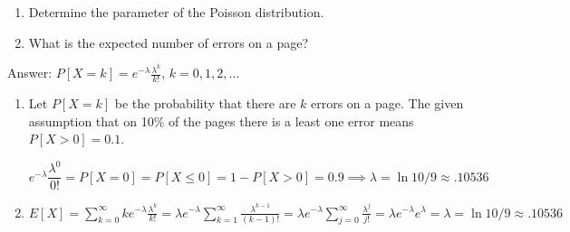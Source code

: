 \documentclass{article}
\begin{document}
\begin{enumerate}
\begin{enumerate}
\item 
Determine the parameter of the Poisson distribution.
\item
What is the expected number of errors on a page?
\end{enumerate}

Answer: $P[X = k] = e^{-\lambda}\frac{\lambda^k}{k!}$, $k = 0,1,2,\dots $

\begin{enumerate}
\item Let $P[X = k]$ be the probability that there are $k$ errors on a page. The given assumption that on 10\% of the pages there is a least one error means $P[X >0] = 0.1$.

$$
e^{-\lambda} \frac{\lambda^0}{0!} = P[X = 0] = P[X \leq 0] = 1- P[X > 0] = 0.9 \implies \lambda = \boxed{\ln 10/9 \approx .10536}
$$

\item

$E[X] = \sum_{k=0}^\infty k e^{-\lambda} \frac{\lambda^k}{k!} = \lambda e^{-\lambda} \sum_{k=1}^\infty \frac{\lambda^{k-1}}{(k-1)!} = \lambda e^{-\lambda} \sum_{j=0}^\infty \frac{\lambda^j}{j!} = \lambda e^{-\lambda} e^{\lambda} = \lambda = \boxed{\ln 10/9 \approx .10536}$
\end{enumerate}

\end{enumerate}
\end{document}
